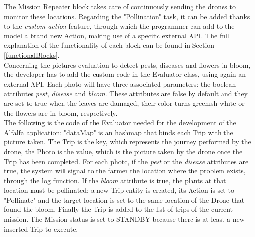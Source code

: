 The Mission Repeater block takes care of continuously sending the drones to monitor these locations.
Regarding the "Pollination" task, it can be added thanks to the \textit{custom action} feature, through which the programmer can add to the model a brand new Action, making use of a specific external API.
The full explanation of the functionality of each block can be found in Section \ref{functionalBlocks}.
\\

Concerning the pictures evaluation to detect pests, diseases and flowers in bloom, the developer has to add the custom code in the Evaluator class, using again an external API. 
Each photo will have three associated parameters: the boolean attributes \textit{pest}, \textit{disease} and \textit{bloom}.
These attributes are false by default and they are set to true when the leaves are damaged, their color turns greenish-white or the flowers are in bloom, respectively. 
\\

The following is the code of the Evaluator needed for the development of the Alfalfa\cite{alfalfa} application:
"dataMap" is an hashmap that binds each Trip with the picture taken. 
The Trip is the key, which represents the journey performed by the drone, the Photo is the value, which is the picture taken by the drone once the Trip has been completed.
For each photo, if the \textit{pest} or the \textit{disease} attributes are true, the system will signal to the farmer the location where the problem exists, through the log function.
If the \textit{bloom} attribute is true, the plants at that location must be pollinated: a new Trip entity is created, its Action is set to "Pollinate" and the target location is set to the same location of the Drone that found the bloom.
Finally the Trip is added to the list of trips of the current mission.
The Mission status is set to STANDBY because there is at least a new inserted Trip to execute.
\\


